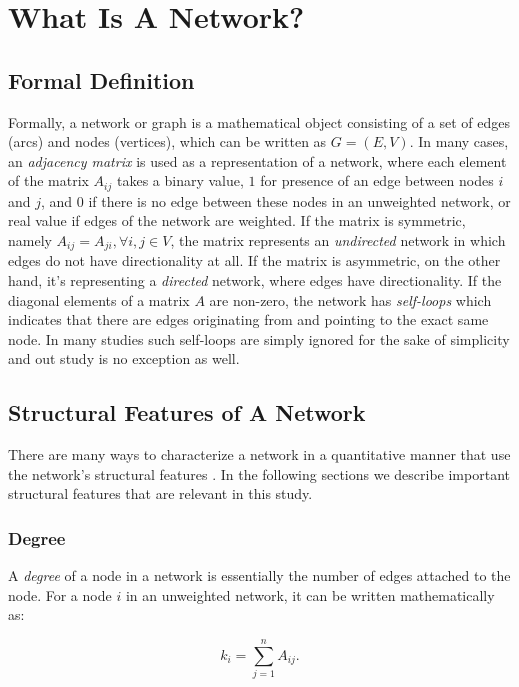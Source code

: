 \documentclass{article}
\begin{document}
\section{What Is A Network?}
	\subsection{Formal Definition}
	Formally, a network or graph is a mathematical object consisting of a set of edges (arcs) and nodes (vertices), which can be written as $G = (E,V)$. In many cases, an \textit{adjacency matrix} is used as a representation of a network, where each element of the matrix $A_{ij}$ takes a binary value, $1$ for presence of an edge between nodes $i$ and $j$, and $0$ if there is no edge between these nodes in an unweighted network, or real value if edges of the network are weighted. If the matrix is symmetric, namely $A_{ij} = A_{ji},  \forall i,j \in V$, the matrix represents an \textit{undirected} network in which edges do not have directionality at all. If the matrix is asymmetric, on the other hand, it's representing a \textit{directed} network, where edges have directionality. If the diagonal elements of a matrix $A$ are non-zero, the network has \textit{self-loops} which indicates that there are edges originating from and pointing to the exact same node. In many studies such self-loops are simply ignored for the sake of simplicity and out study is no exception as well.
	
	\subsection{Structural Features of A Network}
	There are many ways to characterize a network in a quantitative manner that use the network's structural features \cite{Newman:NetworksIntro,NetworkCharacterizationSurvey}. In the following sections we describe important structural features that are relevant in this study.
		
	 
	\subsubsection{Degree}
	A \textit{degree} of a node in a network is essentially the number of edges attached to the node. For a node $i$ in an unweighted network, it can be written mathematically as:
	
	\begin{equation}
 	 k_i = \sum_{j = 1}^n A_{ij}.
	\end{equation}
	
\end{document}
